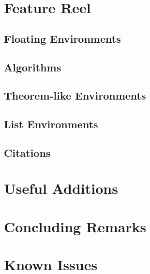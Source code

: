 \documentclass[logo]{mlai-report}
\begin{document}
	\section{Feature Reel} 
	
	\subsection{Floating Environments} 

	\subsection{Algorithms}

	\subsection{Theorem-like Environments} 
	
	\subsection{List Environments} 
	
	\subsection{Citations} 
	
	\section{Useful Additions} 
	
	\section{Concluding Remarks}
	
	\printbibliography
	
	\appendix
	
	\section{Known Issues} 
\end{document}
